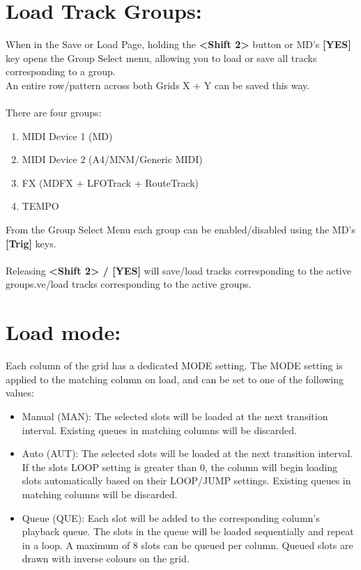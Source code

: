 \section{Load Track Groups:}
When in the Save or Load Page, holding the \textbf{<Shift 2>} button or MD's \textbf{[YES]} key opens the Group Select menu,
allowing you to load or save all tracks corresponding to a group.\\An entire row/pattern across both Grids X + Y can be saved this way.\\
\\
There are four groups:
\begin{enumerate}
    \item MIDI Device 1 (MD)
    \item MIDI Device 2 (A4/MNM/Generic MIDI)
    \item FX (MDFX + LFOTrack + RouteTrack)
    \item TEMPO
\end{enumerate}
From the Group Select Menu each group can be enabled/disabled using the MD's \textbf{[Trig]} keys.\\
\\
Releasing \textbf{<Shift 2> / [YES]} will save/load tracks corresponding to the active groups.ve/load tracks corresponding to the active groups.
\newpage
\section{Load mode:}
Each column of the grid has a dedicated MODE setting. The MODE setting is applied to the matching column on load, and can be set to one of the following values:

\begin{itemize}
    \item Manual (MAN):  The selected slots will be loaded at the next transition interval. Existing queues in matching columns will be discarded.
    \item Auto (AUT): The selected slots will be loaded at the next transition interval. If the slots LOOP setting is greater than 0, the column will begin loading slots automatically based on their LOOP/JUMP settings. Existing queues in matching columns will be discarded.
    \item Queue (QUE): Each slot will be added to the corresponding column's playback queue. The slots in the queue will be loaded sequentially and repeat in a loop. A maximum of 8 slots can be queued per column. Queued slots are drawn with inverse colours on the grid.
\end{itemize}

